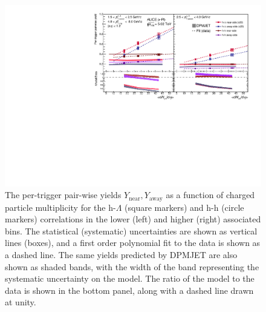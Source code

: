 \begin{figure}[h!]
\centering
\includegraphics[width=\textwidth]{figures/results/final_pairwise_plot_new_x_axis_model_ratio.pdf}
\caption{The per-trigger pair-wise yields $Y_{\text{near}}, Y_{\text{away}}$ as a function of charged particle multiplicity for the h-$\Lambda$ (square markers) and h-h (circle markers) correlations in the lower (left) and higher (right) associated \pt bins. The statistical (systematic) uncertainties are shown as vertical lines (boxes), and a first order polynomial fit to the data is shown as a dashed line. The same yields predicted by DPMJET are also shown as shaded bands, with the width of the band representing the systematic uncertainty on the model. The ratio of the model to the data is shown in the bottom panel, along with a dashed line drawn at unity.}
\label{fig:pairwise_yield}
\end{figure}

